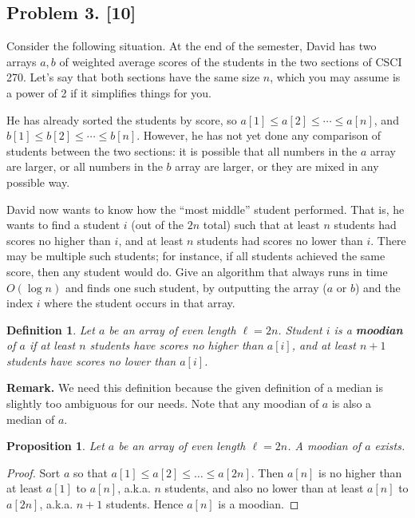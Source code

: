 \documentclass[10pt]{article}
\newtheorem{proposition}[lemma]{Proposition}
\newtheorem{definition}{Definition}
\begin{document}
\subsection*{Problem 3. [10]}

  Consider the following situation. At the end of the semester, David has two arrays $a,b$ of weighted average scores of the students in the two sections of CSCI 270. Let's say that both sections have the same size $n$, which you may assume is a power of 2 if it simplifies things for you.

  He has already sorted the students by score, so $a[1] \leq a[2] \leq \cdots \leq a[n]$, and $b[1] \leq b[2] \leq \cdots \leq b[n]$. However, he has not yet done any comparison of students between the two sections: it is possible that all numbers in the $a$ array are larger, or all numbers in the $b$ array are larger, or they are mixed in any possible way.

  David now wants to know how the ``most middle'' student performed. That is, he wants to find a student $i$ (out of the $2n$ total) such that at least $n$ students had scores no higher than $i$, and at least $n$ students had scores no lower than $i$. There may be multiple such students; for instance, if all students achieved the same score, then any student would do. Give an algorithm that always runs in time $O(\log n)$ and finds one such student, by outputting the array ($a$ or $b$) and the index $i$ where the student occurs in that array. 

\begin{definition}
  Let \(a\) be an array of even length \(\ell = 2n\). Student \(i\) is a \textbf{moodian} of \(a\) if at least \(n\) students have scores no higher than \(a[i]\), and at least \(n + 1\) students have scores no lower than \(a[i]\).
\end{definition}

\textbf{Remark.} We need this definition because the given definition of a median is slightly too ambiguous for our needs. Note that any moodian of \(a\) is also a median of \(a\). 

\begin{proposition}
  Let \(a\) be an array of even length \(\ell = 2n\). A moodian of \(a\) exists. 
\end{proposition}

\begin{proof}
  Sort \(a\) so that \(a[1] \leq a[2] \leq \ldots \leq a[2n]\). Then \(a[n]\) is no higher than at least \(a[1]\) to \(a[n]\), a.k.a. \(n\) students, and also no lower than at least \(a[n]\) to \(a[2n]\), a.k.a. \(n + 1\) students. Hence \(a[n]\) is a moodian.
\end{proof}
\end{document}
